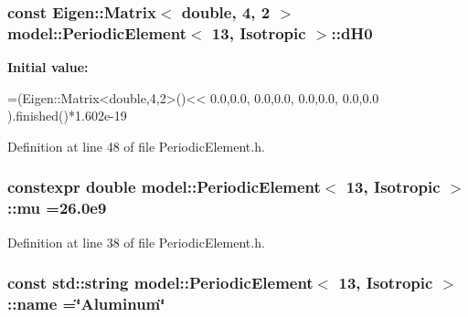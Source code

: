 \subsubsection[{d\+H0}]{\setlength{\rightskip}{0pt plus 5cm}const Eigen\+::\+Matrix$<$ double, 4, 2 $>$ {\bf model\+::\+Periodic\+Element}$<$ 13, {\bf Isotropic} $>$\+::d\+H0\hspace{0.3cm}{\ttfamily [static]}}\label{structmodel_1_1_periodic_element_3_0113_00_01_isotropic_01_4_a90e4f24781a40aacc68fd794232a841e}
{\bfseries Initial value\+:}
\begin{DoxyCode}
=(Eigen::Matrix<double,4,2>()<<
                                                                        0.0,0.0, 
                                                                        0.0,0.0,
                                                                        0.0,0.0,
                                                                        0.0,0.0
                                                                        ).finished()*1.602e-19
\end{DoxyCode}


Definition at line 48 of file Periodic\+Element.\+h.

\hypertarget{structmodel_1_1_periodic_element_3_0113_00_01_isotropic_01_4_a5c43eb0974cc0bf646ff57bfa5a6c03e}{}
\subsubsection[{mu}]{\setlength{\rightskip}{0pt plus 5cm}constexpr double {\bf model\+::\+Periodic\+Element}$<$ 13, {\bf Isotropic} $>$\+::mu =26.\+0e9\hspace{0.3cm}{\ttfamily [static]}}\label{structmodel_1_1_periodic_element_3_0113_00_01_isotropic_01_4_a5c43eb0974cc0bf646ff57bfa5a6c03e}


Definition at line 38 of file Periodic\+Element.\+h.

\hypertarget{structmodel_1_1_periodic_element_3_0113_00_01_isotropic_01_4_a1a62b7ec6064852353108f38a2cbdcf5}{}
\subsubsection[{name}]{\setlength{\rightskip}{0pt plus 5cm}const std\+::string {\bf model\+::\+Periodic\+Element}$<$ 13, {\bf Isotropic} $>$\+::name =\char`\"{}Aluminum\char`\"{}\hspace{0.3cm}{\ttfamily [static]}}\label{structmodel_1_1_periodic_element_3_0113_00_01_isotropic_01_4_a1a62b7ec6064852353108f38a2cbdcf5}


